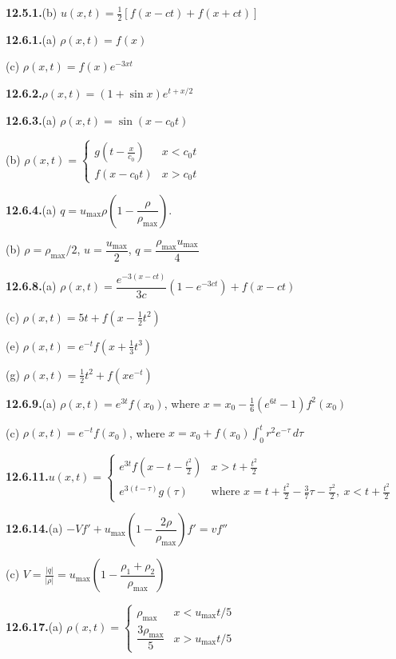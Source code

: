 \medskip
\textbf{12.5.1.}\quad (b) $u(x,t) = \frac{1}{2}[f(x-ct)+f(x+ct)]$

\medskip
\textbf{12.6.1.}\quad (a) $\rho(x,t) = f(x)$

\quad (c) $\rho(x,t) = f(x)e^{-3xt}$%

\medskip
\textbf{12.6.2.}\quad $\rho(x,t) = (1+\sin x)e^{t+x/2}$%

\medskip
\textbf{12.6.3.}\quad (a) $\rho(x,t) = \sin(x - c_0 t)$

\quad (b) $\rho(x,t) = \begin{cases} g\left(t - \frac{x}{c_0}\right) & x < c_0 t \\ f(x - c_0 t) & x > c_0 t \end{cases}$

\medskip
\textbf{12.6.4.}\quad (a) $q = u_{\max}\rho\left(1 - \dfrac{\rho}{\rho_{\max}}\right)$.

\quad (b) $\rho = \rho_{\max}/2$, $u = \dfrac{u_{\max}}{2}$, $q = \dfrac{\rho_{\max}u_{\max}}{4}$

\medskip
\textbf{12.6.8.}\quad (a) $\rho(x,t) = \dfrac{e^{-3(x-ct)}}{3c}(1-e^{-3ct})+f(x-ct)$

\quad (c) $\rho(x,t) = 5t + f\left(x - \frac{1}{2}t^2\right)$

\quad (e) $\rho(x,t) = e^{-t}f\left(x + \frac{1}{3}t^3\right)$

\quad (g) $\rho(x,t) = \frac{1}{2}t^2 + f(xe^{-t})$

\medskip
\textbf{12.6.9.}\quad (a) $\rho(x,t) = e^{3t}f(x_0)$, where $x = x_0 - \frac{1}{6}(e^{6t}-1)f^2(x_0)$

\quad (c) $\rho(x,t) = e^{-t}f(x_0)$, where $x = x_0 + f(x_0)\int_0^t r^2 e^{-\tau}\,d\tau$

\medskip
\textbf{12.6.11.}\quad $u(x,t) = \begin{cases} e^{3t}f\left(x-t-\frac{t^2}{2}\right) & x > t+\frac{t^2}{2} \\ e^{3(t-\tau)}g(\tau) & \text{where } x = t + \frac{t^2}{2} - \frac{3}{7}\tau - \frac{\tau^2}{2},\  x < t + \frac{t^2}{2} \end{cases}$%

\medskip
\textbf{12.6.14.}\quad (a) $-Vf' + u_{\max}\left(1-\dfrac{2\rho}{\rho_{\max}}\right)f' = vf''$

\quad (c) $V = \frac{|q|}{|\rho|} = u_{\max}\left(1-\dfrac{\rho_1+\rho_2}{\rho_{\max}}\right)$

\medskip
\textbf{12.6.17.}\quad (a) $\rho(x,t) = \begin{cases} \rho_{\max} & x < u_{\max}t/5 \\ \dfrac{3\rho_{\max}}{5} & x > u_{\max}t/5 \end{cases}$

